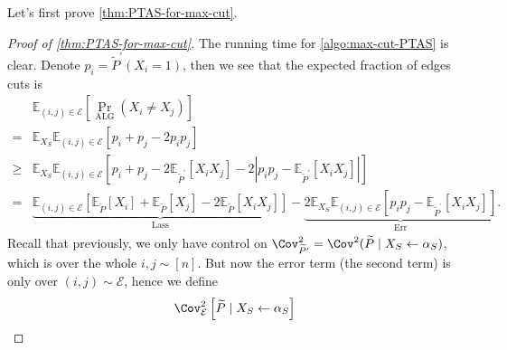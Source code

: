 Let's first prove \autoref{thm:PTAS-for-max-cut}.

\begin{proof}[Proof of \autoref{thm:PTAS-for-max-cut}]
	The running time for \autoref{algo:max-cut-PTAS} is clear. Denote \(p_i = \widetilde{P} ^\prime (X_i = 1)\), then we see that the expected fraction of edges cuts is
	\[
		\begin{split}
			     & \mathbb{E}_{(i, j)\in \mathcal{E} }\left[ \Pr_{\mathrm{ALG}}(X_i \neq X_j) \right]                                                                                                                                                                                                                                                                                                                      \\
			=    & \mathbb{E}_{X_S}\mathbb{E}_{(i, j)\in \mathcal{E} }\left[p_i + p_j - 2 p_i p_j \right]                                                                                                                                                                                                                                                                                                                  \\
			\geq & \mathbb{E}_{X_S}\mathbb{E}_{(i, j)\in \mathcal{E} }\left[ p_i + p_j - 2 \mathbb{E}_{\widetilde{P} ^\prime }\left[X_i X_j \right] - 2 \left\vert p_i p_j - \mathbb{E}_{\widetilde{P} ^\prime }\left[X_i X_j \right]  \right\vert  \right]                                                                                                                                                                \\
			=    & \underbrace{\mathbb{E}_{(i, j)\in \mathcal{E} }\left[ \mathbb{E}_{\widetilde{P} }\left[X_i \right] + \mathbb{E}_{\widetilde{P} }\left[X_j \right] - 2 \mathbb{E}_{\widetilde{P} }\left[ X_i X_j\right]  \right]}_{\mathrm{Lass}} - \underbrace{2 \mathbb{E}_{X_S} \mathbb{E}_{(i, j)\in \mathcal{E} }\left[ p_i p_j - \mathbb{E}_{\widetilde{P} ^\prime }\left[ X_i X_j\right] \right]}_{\mathrm{Err}}.
		\end{split}
	\]
	Recall that previously, we only have control on \(\Cov_{\widetilde{P} ^\prime }^{2} = \Cov^2(\widetilde{P} \mid X_S\gets \alpha _S)\), which is over the whole \(i, j\sim[n]\). But now the error term (the second term) is only over \((i, j)\sim \mathcal{E} \), hence we define
	\[
		\Cov_{\mathcal{E} }^2\left[ \widetilde{P} \mid X_S \gets \alpha _S\right]
\]
\end{proof}
